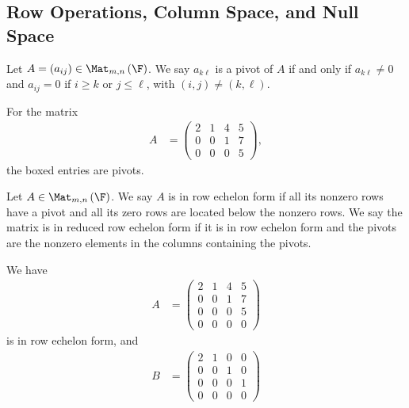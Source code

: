 \documentclass[10pt]{mypackage}
\begin{document}
\subsection{Row Operations, Column Space, and Null Space}%
\begin{definition}[Pivot]
  Let $A = \left(a_{ij}\right)\in \Mat_{m,n}\left(\F\right)$. We say $a_{k\ell}$ is a pivot of $A$ if and only if $a_{k\ell}\neq 0$ and $a_{ij} = 0$ if $i\geq k$ or $j\leq \ell$, with $\left(i,j\right)\neq \left(k,\ell\right)$.
\end{definition}
\begin{example}
  For the matrix
  \begin{align*}
    A &= \begin{pmatrix}\boxed{2} & 1 & 4 & 5 \\ 0 & 0 & \boxed{1} & 7 \\ 0 & 0 & 0 & \boxed{5}\end{pmatrix},
  \end{align*}
  the boxed entries are pivots.
\end{example}
\begin{definition}
  Let $A\in \Mat_{m,n}\left(\F\right)$. We say $A$ is in row echelon form if all its nonzero rows have a pivot and all its zero rows are located below the nonzero rows. We say the matrix is in reduced row echelon form if it is in row echelon form and the pivots are the nonzero elements in the columns containing the pivots.
\end{definition}
\begin{example}
  We have
  \begin{align*}
    A &= \begin{pmatrix}2 & 1 & 4 & 5 \\ 0 & 0 & 1 & 7 \\ 0 & 0 & 0 & 5 \\ 0 & 0 & 0 & 0\end{pmatrix}
  \end{align*}
  is in row echelon form, and
  \begin{align*}
    B &= \begin{pmatrix}2 & 1 & 0 & 0 \\ 0 & 0 & 1 & 0 \\ 0 & 0 & 0 & 1\\0 & 0 & 0 & 0\end{pmatrix}
  \end{align*}
\end{example}
\end{document}
